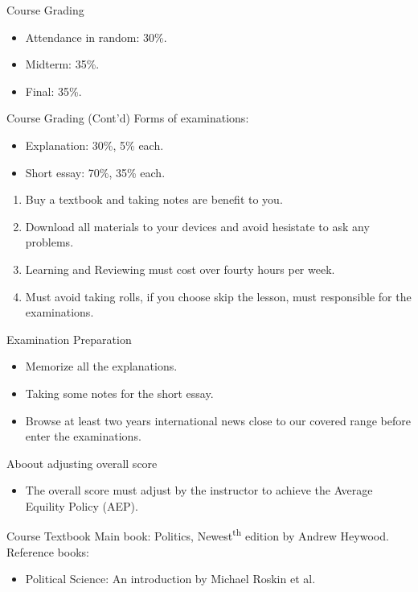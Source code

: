 \documentclass{beamer}
\begin{document}
\begin{frame}{Course Grading}
\begin{itemize}
\item Attendance in random: 30\%.
\item Midterm: 35\%.
\item Final: 35\%.
\end{itemize}
\end{frame}
\begin{frame}{Course Grading (Cont'd)}
Forms of examinations:
\begin{itemize}
\item Explanation: 30\%, 5\% each.
\item Short essay: 70\%, 35\% each.
\end{itemize}
\begin{enumerate}
\item Buy a textbook and taking notes are benefit to you.
\item Download all materials to your devices and avoid hesistate to ask any problems.
\item Learning and Reviewing must cost over fourty hours per week.
\item Must avoid taking rolls, if you choose skip the lesson, must responsible for the examinations.
\end{enumerate}
\end{frame}
\begin{frame}{Examination Preparation}
\begin{itemize}
\item Memorize all the explanations.
\item Taking some notes for the short essay.
\item Browse at least two years international news close to our covered range before enter the examinations.
\end{itemize}
\begin{block}{Aboout adjusting overall score}
\begin{itemize}
\item The overall score must adjust by the instructor to achieve the Average Equility Policy (AEP).
\end{itemize}
\end{block}
\end{frame}
\begin{frame}{Course Textbook}
Main book: Politics, Newest\textsuperscript{th} edition by Andrew Heywood. \\
Reference books:
\begin{itemize}
\item Political Science: An introduction by Michael Roskin et al.
\end{itemize}
\end{frame}
\end{document}
